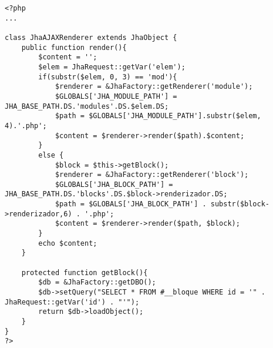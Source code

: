 \begin{lstlisting}[label=jha_renderer_ajax,caption=Renderizador las llamadas as\'incronas.]
<?php
...

class JhaAJAXRenderer extends JhaObject {
    public function render(){
        $content = '';
        $elem = JhaRequest::getVar('elem');
        if(substr($elem, 0, 3) == 'mod'){
        	$renderer = &JhaFactory::getRenderer('module');
        	$GLOBALS['JHA_MODULE_PATH'] = JHA_BASE_PATH.DS.'modules'.DS.$elem.DS;
            $path = $GLOBALS['JHA_MODULE_PATH'].substr($elem, 4).'.php';
            $content = $renderer->render($path).$content;
        }
        else {
        	$block = $this->getBlock();
        	$renderer = &JhaFactory::getRenderer('block');
        	$GLOBALS['JHA_BLOCK_PATH'] = JHA_BASE_PATH.DS.'blocks'.DS.$block->renderizador.DS;
            $path = $GLOBALS['JHA_BLOCK_PATH'] . substr($block->renderizador,6) . '.php';
            $content = $renderer->render($path, $block);
        }
        echo $content;
    }
    
    protected function getBlock(){
    	$db = &JhaFactory::getDBO();
        $db->setQuery("SELECT * FROM #__bloque WHERE id = '" . JhaRequest::getVar('id') . "'");
        return $db->loadObject();
    }
}
?>
\end{lstlisting}
